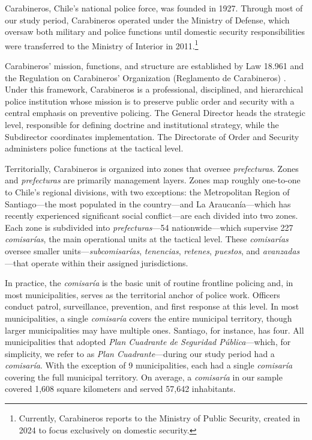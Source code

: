 Carabineros, Chile's national police force, was founded in 1927. Through most of our study period, Carabineros operated under the Ministry of Defense, which oversaw both military and police functions until domestic security responsibilities were transferred to the Ministry of Interior in 2011.\footnote{Currently, Carabineros reports to the Ministry of Public Security, created in 2024 to focus exclusively on domestic security.}

Carabineros' mission, functions, and structure are established by Law 18.961 and the Regulation on Carabineros' Organization (Reglamento de Carabineros) \citep{Ley18961,ReglamentoCarabineros1989}. Under this framework, Carabineros is a professional, disciplined, and hierarchical police institution whose mission is to preserve public order and security with a central emphasis on preventive policing. The General Director heads the strategic level, responsible for defining doctrine and institutional strategy, while the Subdirector coordinates implementation. The Directorate of Order and Security administers police functions at the tactical level.

Territorially, Carabineros is organized into zones that oversee \emph{prefecturas}. Zones and \emph{prefecturas} are primarily management layers. Zones map roughly one-to-one to Chile's regional divisions, with two exceptions: the Metropolitan Region of Santiago---the most populated in the country---and La Araucanía---which has recently experienced significant social conflict---are each divided into two zones. Each zone is subdivided into \emph{prefecturas}---54 nationwide---which supervise 227 \emph{comisar\'ias}, the main operational units at the tactical level. These \emph{comisar\'ias} oversee smaller units---\emph{subcomisar\'ias}, \emph{tenencias}, \emph{retenes}, \emph{puestos}, and \emph{avanzadas}---that operate within their assigned jurisdictions.

In practice, the \emph{comisar\'ia} is the basic unit of routine frontline policing and, in most municipalities, serves as the territorial anchor of police work. Officers conduct patrol, surveillance, prevention, and first response at this level. In most municipalities, a single \emph{comisar\'ia} covers the entire municipal territory, though larger municipalities may have multiple ones. Santiago, for instance, has four. %
All municipalities that adopted \emph{Plan Cuadrante de Seguridad P\'ublica}---which, for simplicity, we refer to as \emph{Plan Cuadrante}---during our study period had a \emph{comisar\'ia}. With the exception of 9 municipalities, each had a single \emph{comisar\'ia} covering the full municipal territory. On average, a \emph{comisar\'ia} in our sample covered 1,608 square kilometers and served 57,642 inhabitants. %

